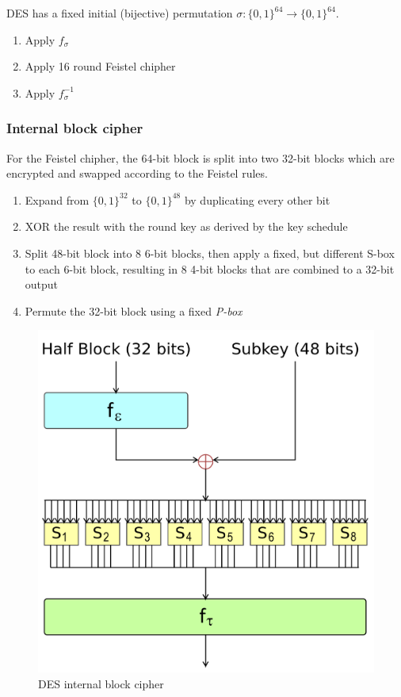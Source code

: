 \documentclass[a4paper]{scrartcl}
\begin{document}
DES has a fixed initial (bijective) permutation $\sigma: \{0,1\}^{64} \rightarrow \{0,1\}^{64}$.
\begin{enumerate}
    \item Apply $f_\sigma$
    \item Apply 16 round Feistel chipher
    \item Apply $f_\sigma^{-1}$
\end{enumerate}

\subsubsection{Internal block cipher}

For the Feistel chipher, the 64-bit block is split into two 32-bit blocks which are encrypted
and swapped according to the Feistel rules.

\begin{enumerate}
    \item Expand from $\{0,1\}^{32}$ to $\{0,1\}^{48}$ by duplicating every other bit
    \item XOR the result with the round key as derived by the key schedule
    \item Split 48-bit block into 8 6-bit blocks, then apply a fixed, but different S-box to each
        6-bit block, resulting in 8 4-bit blocks that are combined to a 32-bit output
    \item Permute the 32-bit block using a fixed \textit{P-box}
\end{enumerate}

\begin{figure}
    \centering
    \includegraphics[scale=0.2]{images/des.png}
    \caption{DES internal block cipher}
\end{figure}
\end{document}
